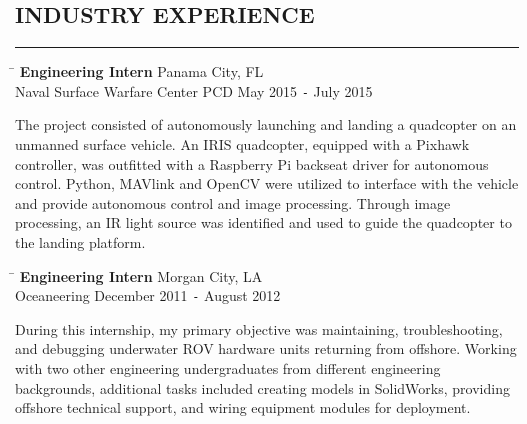 \documentclass{res}
\begin{document}
\begin{resume}
\section{INDUSTRY EXPERIENCE}
	\vspace{0.005in}	
	\rule{\textwidth}{0.5pt}
	\vspace{-0.4in}
	\begin{tabbing}
		\hspace{4.652in}\= \kill %
		{\bf Engineering Intern} \> \hspace{0.3in}Panama City, FL  \\  
		 Naval Surface Warfare Center PCD \> May 2015 \texttt{-} July 2015	
	\end{tabbing}\vspace{-20pt}      %
	\vspace{8pt}The project consisted of autonomously launching and landing a quadcopter on an unmanned surface vehicle. An IRIS quadcopter, equipped with a Pixhawk controller, was outfitted with a Raspberry Pi backseat driver for autonomous control. Python, MAVlink and OpenCV were utilized to interface with the vehicle and provide autonomous control and image processing. Through image processing, an IR light source was identified and used to guide the quadcopter to the landing platform.
		\vspace{-0.2in}
	\begin{tabbing}
		\hspace{4.155in}\=  \kill %
		{\bf Engineering Intern} \> \hspace{0.815in}Morgan City, LA \\
		Oceaneering \>December 2011 \texttt{-} August 2012
	\end{tabbing}\vspace{-20pt}
	\vspace{8pt}During this internship, my primary objective was maintaining, troubleshooting, and debugging underwater ROV hardware units returning from offshore. Working with two other engineering undergraduates from different engineering backgrounds, additional tasks included creating models in SolidWorks, providing offshore technical support, and wiring equipment modules for deployment.


\end{resume}
\end{document}
